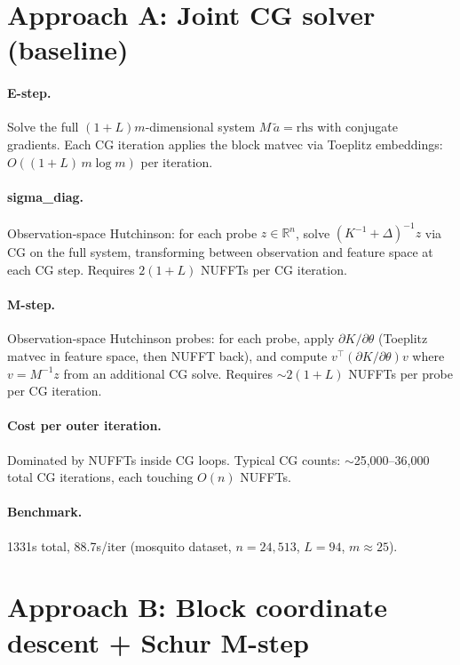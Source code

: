 \documentclass[11pt]{article}
\newcommand{\R}{\mathbb{R}}
\begin{document}
\section{Approach A: Joint CG solver (baseline)}

\paragraph{E-step.}
Solve the full $(1{+}L)m$-dimensional system $M\,\tilde a = \text{rhs}$
with conjugate gradients. Each CG iteration applies the block
matvec via Toeplitz embeddings: $O((1{+}L)\,m\log m)$ per iteration.

\paragraph{sigma\_diag.}
Observation-space Hutchinson: for each probe $z \in \R^n$,
solve $(K^{-1} + \Delta)^{-1} z$ via CG on the full system,
transforming between observation and feature space at each CG step.
Requires $2(1{+}L)$ NUFFTs per CG iteration.

\paragraph{M-step.}
Observation-space Hutchinson probes: for each probe,
apply $\partial K/\partial\theta$ (Toeplitz matvec in feature space,
then NUFFT back), and compute $v^\top (\partial K/\partial\theta) v$
where $v = M^{-1} z$ from an additional CG solve.
Requires $\sim 2(1{+}L)$ NUFFTs per probe per CG iteration.

\paragraph{Cost per outer iteration.}
Dominated by NUFFTs inside CG loops. Typical CG counts:
$\sim$25,000--36,000 total CG iterations, each touching
$O(n)$ NUFFTs.

\paragraph{Benchmark.} 1331s total, 88.7s/iter (mosquito dataset,
$n{=}24{,}513$, $L{=}94$, $m{\approx}25$).

\section{Approach B: Block coordinate descent + Schur M-step}
\end{document}
